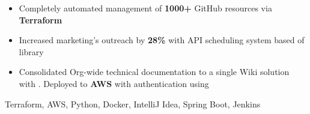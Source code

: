 \begin{experiences}
{\begin{itemize}
                        \item Completely automated management of \textbf{1000+} GitHub resources via \textbf{Terraform}

                        \item Increased marketing's outreach by \textbf{28\%} with API scheduling system based of  library
                        
                        \item Consolidated Org-wide technical documentation to a single Wiki solution with . Deployed to \textbf{AWS} with authentication using 
                    \end{itemize}
                    }
                    {Terraform, AWS, Python, Docker, IntelliJ Idea, Spring Boot, Jenkins}
\end{experiences}
